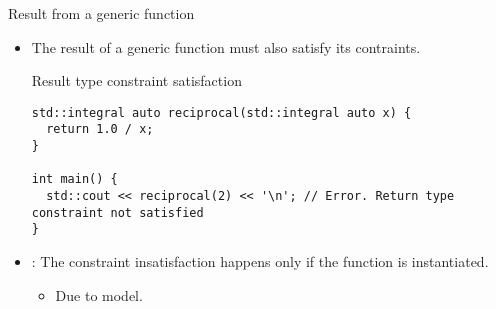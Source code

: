 \begin{frame}[t,fragile]{Result from a generic function}
\begin{itemize}
  \item The result of a generic function must also satisfy its contraints.
\begin{block}{Result type constraint satisfaction}
\begin{lstlisting}
std::integral auto reciprocal(std::integral auto x) {
  return 1.0 / x;
}

int main() {
  std::cout << reciprocal(2) << '\n'; // Error. Return type constraint not satisfied
}  
\end{lstlisting}
\end{block}

  \item {}: The constraint insatisfaction happens only if the function is
        instantiated.
    \begin{itemize}
      \item Due to  model.
    \end{itemize}

\end{itemize}

\end{frame}
